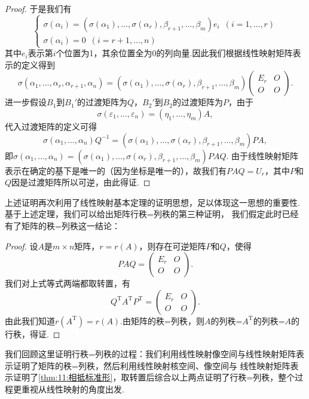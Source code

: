 \begin{proof}
    于是我们有
    \[\begin{cases}
        \sigma(\alpha_i)=(\sigma(\alpha_1),\ldots,\sigma(\alpha_r),\beta_{r+1},\ldots,\beta_m)e_i\enspace(i=1,\ldots,r) \\
        \sigma(\alpha_i)=0\enspace(i=r+1,\ldots,n)
    \end{cases}\]
    其中$e_i$表示第$i$个位置为1，其余位置全为0的列向量.因此我们根据线性映射矩阵表示的定义得到
    \[\sigma(\alpha_1,\ldots,\alpha_r,\alpha_{r+1},\alpha_n)=(\sigma(\alpha_1),\ldots,\sigma(\alpha_r),\beta_{r+1},\ldots,\beta_m)\begin{pmatrix}
        E_r & O \\ O & O
    \end{pmatrix}.\]
    进一步假设$B_1$到$B_1'$的过渡矩阵为$Q$，$B_2'$到$B_2$的过渡矩阵为$P$，由于
    \[\sigma(\varepsilon_1,\ldots,\varepsilon_n)=(\eta_1,\ldots,\eta_m)A,\]
    代入过渡矩阵的定义可得
    \[\sigma(\alpha_1,\ldots,\alpha_n)Q^{-1}=(\sigma(\alpha_1),\ldots,\sigma(\alpha_r),\beta_{r+1},\ldots,\beta_m)PA,\]
    即$\sigma(\alpha_1,\ldots,\alpha_n)=(\sigma(\alpha_1),\ldots,\sigma(\alpha_r),\beta_{r+1},\ldots,\beta_m)PAQ$.
    由于线性映射矩阵表示在确定的基下是唯一的（因为坐标是唯一的），故我们有$PAQ=U_r$，其中$P$和$Q$因是过渡矩阵所以可逆，由此得证.
\end{proof}

上述证明再次利用了线性映射基本定理的证明思想，足以体现这一思想的重要性.基于上述定理，我们可以给出矩阵行秩=列秩的第三种证明，
我们假定此时已经有了矩阵的秩=列秩这一结论：

\begin{proof}
    设$A$是$m\times n$矩阵，$r=r(A)$，则存在可逆矩阵$P$和$Q$，使得
    \[PAQ=\begin{pmatrix}
        E_r & O \\ O & O
    \end{pmatrix}.\]
    我们对上式等式两端都取转置，有
    \[Q^\mathrm{T}A^\mathrm{T}P^\mathrm{T}=\begin{pmatrix}
        E_r & O \\ O & O
    \end{pmatrix}.\]
    由此我们知道$r(A^\mathrm{T})=r(A)$.由矩阵的秩=列秩，则$A$的列秩=$A^\mathrm{T}$的列秩=$A$的行秩，得证.
\end{proof}

我们回顾这里证明行秩=列秩的过程：我们利用线性映射像空间与线性映射矩阵表示证明了矩阵的秩=列秩，然后利用线性映射核空间、像空间与
线性映射矩阵表示证明了\autoref{thm:11:相抵标准形}，取转置后综合以上两点证明了行秩=列秩，整个过程更重视从线性映射的角度出发.


